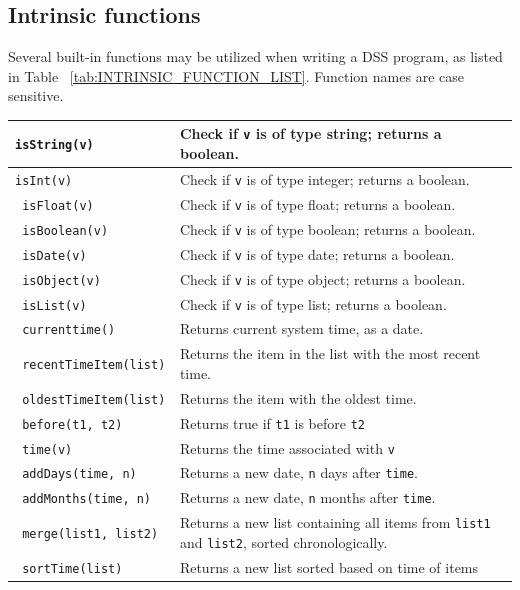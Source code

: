 \documentclass[12pt,letterpaper]{article}
\begin{document}
{\subsection {Intrinsic functions}

	Several built-in functions may be utilized when writing a DSS program, as listed in Table ~\ref{tab:INTRINSIC_FUNCTION_LIST}. Function names are case sensitive.

\begin{table}\begin{centering}
\begin{tabular}{ | >{\tt}l | p{3.66in} | }
\hline
isString(v) & 
Check if \texttt{v} is of type string; returns a boolean. \\ \hline
isInt(v) & 
Check if \texttt{v} is of type integer; returns a boolean. \\ \hline
isFloat(v) & 
Check if \texttt{v} is of type float; returns a boolean. \\ \hline
isBoolean(v) & 
Check if \texttt{v} is of type boolean; returns a boolean. \\ \hline
isDate(v) & 
Check if \texttt{v} is of type date; returns a boolean. \\ \hline
isObject(v) & 
Check if \texttt{v} is of type object; returns a boolean. \\ \hline
isList(v) & 
Check if \texttt{v} is of type list; returns a boolean. \\ \hline
\hline
currenttime() &
Returns current system time, as a date. \\ \hline
recentTimeItem(list) &
Returns the item in the list with the most recent time. \\ \hline
oldestTimeItem(list) &
Returns the item with the oldest time. \\ \hline
before(t1, t2) &
Returns true if \texttt{t1} is before \texttt{t2} \\ \hline
time(v) &
Returns the time associated with \texttt{v} \\ \hline
addDays(time, n) &
Returns a new date, \texttt{n} days after \texttt{time}.
\\ \hline
addMonths(time, n) &
Returns a new date, \texttt{n} months after \texttt{time}.
\\ \hline \hline
merge(list1, list2) &
Returns a new list containing all items from \texttt{list1} and 
\texttt{list2}, sorted chronologically.  \\ \hline
sortTime(list) &
Returns a new list sorted based on time of items 
\\ \hline

\end{tabular}
\end{centering}
\end{table}}
\end{document}
